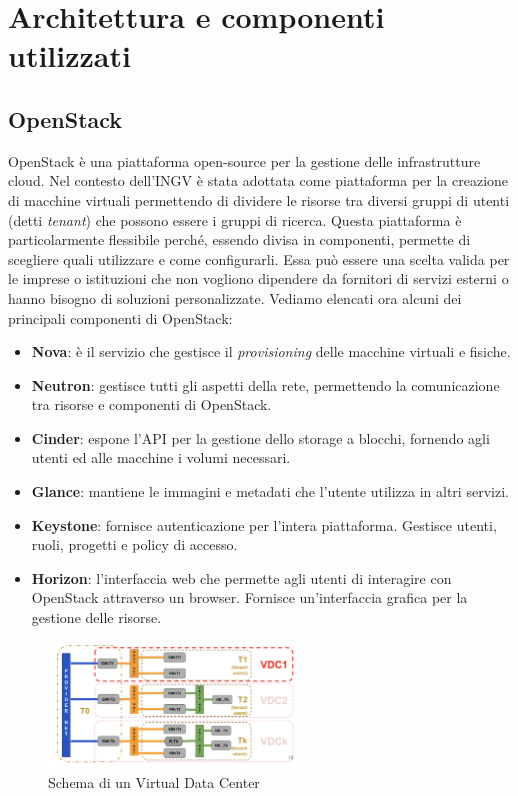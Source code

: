 \documentclass[12pt,a4paper,openright,twoside]{book}
\begin{document}
\chapter{Architettura e componenti utilizzati}
\section{OpenStack}
OpenStack è una piattaforma open-source per la gestione delle infrastrutture cloud. Nel contesto dell'INGV è stata adottata come piattaforma per la creazione di
macchine virtuali permettendo di dividere le risorse tra diversi gruppi di utenti (detti \textit{tenant}) che possono essere i gruppi di ricerca.
Questa piattaforma è particolarmente flessibile perché, essendo divisa in componenti, permette di scegliere quali utilizzare e come configurarli. Essa può essere
una scelta valida per le imprese o istituzioni che non vogliono dipendere da fornitori di servizi esterni o hanno bisogno di soluzioni personalizzate.
Vediamo elencati ora alcuni dei principali componenti di OpenStack\cite{amslaurea29330}:
%
%
\begin{itemize}
    \item \textbf{Nova}: è il servizio che gestisce il \textit{provisioning} delle macchine virtuali e fisiche. 
    \item \textbf{Neutron}: gestisce tutti gli aspetti della rete, permettendo la comunicazione tra risorse e componenti di OpenStack. 
    \item \textbf{Cinder}: espone l'API per la gestione dello storage a blocchi, fornendo agli utenti ed alle macchine i volumi necessari.
    \item \textbf{Glance}: mantiene le immagini e metadati che l'utente utilizza in altri servizi. 
    \item \textbf{Keystone}: fornisce autenticazione per l'intera piattaforma. Gestisce utenti, ruoli, progetti e policy di accesso.
    \item \textbf{Horizon}: l'interfaccia web che permette agli utenti di interagire con OpenStack attraverso un browser. Fornisce un'interfaccia grafica per la gestione delle risorse.
\end{itemize}
\begin{figure}
    \centering
    \includegraphics[width=0.6\textwidth]{figures/vdc-diagram.png}
    \caption{Schema di un Virtual Data Center}
    \label{fig:vdc}
\end{figure}
\end{document}
